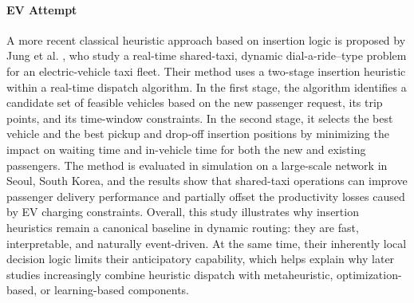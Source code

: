 \paragraph{EV Attempt}
A more recent classical heuristic approach based on insertion logic is proposed by
Jung et al. \cite{jungDuallySustainableUrban2017}, who study a real-time shared-taxi,
dynamic dial-a-ride--type problem for an electric-vehicle taxi fleet. Their method uses a
two-stage insertion heuristic within a real-time dispatch algorithm. In the first stage, the
algorithm identifies a candidate set of feasible vehicles based on the new passenger request,
its trip points, and its time-window constraints. In the second stage, it selects the best
vehicle and the best pickup and drop-off insertion positions by minimizing the impact on waiting
time and in-vehicle time for both the new and existing passengers. The method is evaluated in
simulation on a large-scale network in Seoul, South Korea, and the results show that shared-taxi
operations can improve passenger delivery performance and partially offset the productivity losses
caused by EV charging constraints. Overall, this study illustrates why insertion heuristics remain
a canonical baseline in dynamic routing: they are fast, interpretable, and naturally event-driven.
At the same time, their inherently local decision logic limits their anticipatory capability, which
helps explain why later studies increasingly combine heuristic dispatch with metaheuristic,
optimization-based, or learning-based components.
